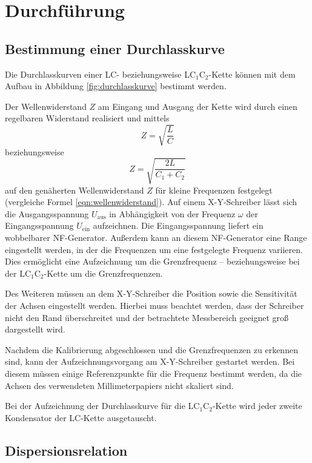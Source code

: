 \section{Durchführung}
\label{sec:Durchführung}

\subsection{Bestimmung einer Durchlasskurve}
Die Durchlasskurven einer LC- beziehungsweise LC$_1$C$_2$-Kette können
mit dem Aufbau in Abbildung \ref{fig:durchlasskurve} bestimmt werden.

Der Wellenwiderstand $Z$ am Eingang und Ausgang der Kette wird durch einen
regelbaren Widerstand realisiert und mittels
\begin{equation}
	Z = \sqrt{\frac{L}{C}}
\end{equation}
beziehungsweise
\begin{equation}
	Z = \sqrt{\frac{2L}{C_1+C_2}}
\end{equation}
auf den genäherten Wellenwiderstand $Z$ für kleine Frequenzen festgelegt (vergleiche Formel \eqref{eqn:wellenwiderstand}).
Auf einem X-Y-Schreiber lässt sich die Ausgangsspannung $U_{\text{aus}}$ in Abhängigkeit von der Frequenz $\omega$ der Eingangsspannung $U_{\text{ein}}$ aufzeichnen.
Die Eingangsspannung liefert ein wobbelbarer NF-Generator.
Außerdem kann an diesem NF-Generator eine Range eingestellt werden, in der die Frequenzen um eine festgelegte Frequenz variieren.
Dies ermöglicht eine Aufzeichnung um die Grenzfrequenz -- beziehungsweise 
bei der LC$_1$C$_2$-Kette um die Grenzfrequenzen.

Des Weiteren müssen an dem X-Y-Schreiber die Position sowie die Sensitivität der Achsen eingestellt werden.
Hierbei muss beachtet werden, dass der Schreiber nicht den Rand überschreitet und der betrachtete Messbereich geeignet groß dargestellt wird.

Nachdem die Kalibrierung abgeschlossen und die Grenzfrequenzen zu erkennen sind, kann der Aufzeichnungsvorgang am X-Y-Schreiber gestartet werden.
Bei diesem müssen einige Referenzpunkte für die Frequenz bestimmt werden, 
da die Achsen des verwendeten Millimeterpapiers nicht skaliert sind.

Bei der Aufzeichnung der Durchlasskurve für die LC$_1$C$_2$-Kette wird jeder zweite Kondensator der LC-Kette ausgetauscht.


\subsection{Dispersionsrelation}

